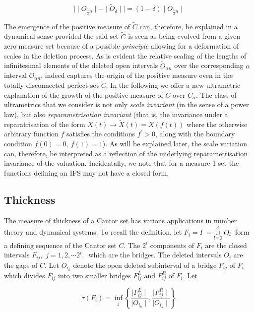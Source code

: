 \documentclass[12pt]{article}
\begin{document}
$$\bigg | \mid O_{\frac{1}{3}n}\mid -\mid  \tilde{O}_{\delta } \mid \bigg | 
=(1-\delta )\mid O_{\frac{1}{3}n}\mid $$

 The emergence of the positive measure of $\tilde{C}$ can, therefore,
be explained in a dynamical sense provided the said set $\tilde C$ is seen
as being  evolved from a given zero measure set because of a possible {\em principle}
allowing for a deformation of scales in the deletion process. As is evident the
relative scaling of the lengths of infinitesimal elements of the deleted
open intervals $\tilde{O}_{\alpha n}$ over the corresponding $\alpha $
interval $O_{\alpha n}$, indeed captures the origin of the positive measure
even in the totally disconnected perfect set $\tilde{C}$. In the following
we offer a new ultrametric explanation of the growth of the positive measure
of $\tilde{C}$ over $C_{\alpha }$. The class of ultrametrics that we
consider is not only {\em scale invariant} (in the sense of a power law), but also {\em reparametrisation invariant} (that is, the invariance under a reparatrisation of the form $X(t)\rightarrow \tilde X(t)=X(f(t))$ where the otherwise arbitrary function $f$ satisfies the conditions $f^{\prime}>0$, along with the boundary condition $ f(0)=0, \ f(1)=1$).
As will be explained later, the scale variation can, therefore, be interpreted  as a reflection of the underlying reparametrisation invariance of the valuation. Incidentally, we note that for a measure 1 set the functions defining an  IFS may not have a closed form\cite{phyd}.

\subsection{Thickness}

The measure of thickness of a Cantor set has various applications in number theory and
dynamical systems. To recall the definition, let $F_{i}=I$\ $-\underset{l=0}{%
\overset{i}{\cup }}O_{l}$\ form a defining sequence of the Cantor set $C$.
The $2^{i}$ components of $F_{i}$ are the closed intervals $F_{ij},$ $%
j=1,2,\cdots 2^{i},$\  which are the bridges. The deleted intervals $O_{i}$
are the gaps of $C$. Let $O_{i_k}$ denote the open deleted  subinterval of a bridge $F_{ij}$ of $F_{i}$ which divides $F_{ij}$ into two smaller bridges $F_{ij}^{L}$ and $F_{ij}^{R}$ of $F_{i}$. Let

$$\tau  (F_{i})= \underset{j}{\inf } \left\{ \frac{\mid F_{ij}^{L}\mid 
}{\mid O_{i_k}\mid },\frac{\mid F_{ij}^{R}\mid }{\mid O_{i_k}\mid }\right\}$$
\end{document}
